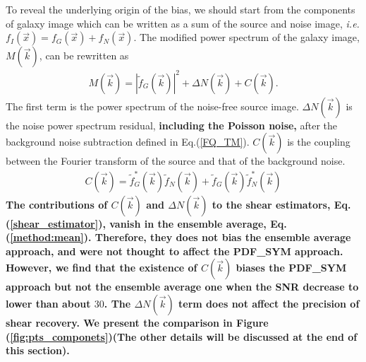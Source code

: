 \documentclass[twocolumn]{aastex62}
\def\ie{{\it i.e. }}
\begin{document}
To reveal the underlying origin of the bias, we should start from the components of galaxy image which can be written as a sum of the source and noise image, \ie$f_I(\vec{x}) = f_G(\vec{x}) + f_N(\vec{x})$. The modified power spectrum of the galaxy image, $M(\vec{k})$, can be rewritten as 
\begin{eqnarray}
M(\vec{k}) =  \left\vert\widetilde{f}_G(\vec{k})\right\vert^2 + \Delta N(\vec{k}) + C(\vec{k}).
\end{eqnarray}
The first term is the power spectrum of the noise-free source image. $\Delta N(\vec{k})$ is the noise power spectrum residual,\textbf{ including the Poisson noise,} after the background noise subtraction defined in Eq.(\ref{FQ_TM}). $C(\vec{k})$ is the coupling between the Fourier transform of the source and that of the background noise. 
\begin{eqnarray}
C(\vec{k}) = \widetilde{f}_{G}^{*}(\vec{k})\widetilde{f}_N(\vec{k}) + \widetilde{f}_{G}(\vec{k})\widetilde{f}_{N}^{*}(\vec{k})
\end{eqnarray}
\textbf{The contributions of $C(\vec{k})$ and $\Delta N(\vec{k})$ to the shear estimators, Eq.(\ref{shear_estimator}), vanish in the ensemble average, Eq.(\ref{method:mean}). Therefore, they does not bias the ensemble average approach, and were not thought to affect the PDF\_SYM approach. However, we find that the existence of $C(\vec{k})$ biases the PDF\_SYM approach but not the ensemble average one when the SNR decrease to lower than about $30$. The $\Delta N(\vec{k})$ term does not affect the precision of shear recovery. We present the comparison in Figure (\ref{fig:pts_componets})(The other details will be discussed at the end of this section).}
\end{document}

